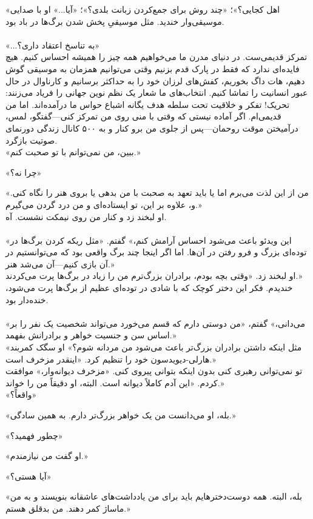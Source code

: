 \noindent
{}

\noindent
{}

\noindent
«اهل کجایی؟»؛ «چند روش برای جمع‌کردن زبانت بلدی؟»؛ «آیا...» او با صدایی موسیقی‌وار خندید. مثل موسیقیِ پخش شدن برگ‌ها در باد بود. \\
 \\
«...به تناسخ اعتقاد داری؟» \\
تمرکز قدیمی‌ست. در دنیای مدرن ما می‌خواهیم همه چیز را همیشه احساس کنیم. هیچ فایده‌ای ندارد که فقط در پارک قدم بزنیم وقتی می‌توانیم همزمان به موسیقی گوش دهیم، هات داگ بخوریم، کفش‌های لرزان خود را به حداکثر برسانیم و کارناوال در حال عبور انسانیت را تماشا کنیم. انتخاب‌های ما شعار یک نظم نوین جهانی را فریاد می‌زنند: تحریک! تفکر و خلاقیت تحت سلطه هدف یگانه اشباع حواس ما درآمده‌اند. اما من قدیمی‌ام. اگر آماده نیستی که وقتی با منی روی من تمرکز کنی—گفتگو، لمس، درآمیختن موقت روحمان—پس از جلوی من برو کنار و به ۵۰۰ کانال زندگی دورنمای صوتیت بازگرد. \\

«ببین، من نمی‌توانم با تو صحبت کنم.»

«چرا نه؟»

«من از این لذت می‌برم اما یا باید تعهد به صحبت با من بدهی یا بروی هنر را نگاه کنی. و، علاوه بر این، تو ایستاده‌ای و من درد گردن می‌گیرم.» \\
او لبخند زد و کنار من روی نیمکت نشست. آه. \\
 \\
«این ویدئو باعث می‌شود احساس آرامش کنم،» گفتم. «مثل ریکه کردن برگ‌ها در توده‌ای بزرگ و فرو رفتن در آن‌ها. اما اگر اینجا چند برگ واقعی بود که می‌توانستیم در آن بازی کنیم—آن می‌شد هنر.» \\
او لبخند زد. «وقتی بچه بودم، برادران بزرگ‌ترم من را زیاد در برگ‌ها پرت می‌کردند.» \\
خندیدم. فکر این دختر کوچک که با شادی در توده‌ای عظیم از برگ‌ها پرت می‌شود، خنده‌دار بود. \\
 \\
«می‌دانی،» گفتم، «من دوستی دارم که قسم می‌خورد می‌تواند شخصیت یک نفر را بر اساس سن و جنسیت خواهر و برادرانش بفهمد.» \\
«مثل اینکه داشتن برادران بزرگ‌تر باعث می‌شود من مردانه شوم؟» او سگک کمربند هارلی-دیویدسون خود را تنظیم کرد. «اینقدر مزخرف است.» \\
تو نمی‌توانی رهبری کنی بدون اینکه بتوانی پیروی کنی. «مزخرف دیوانه‌وار،» موافقت کردم. «این آدم کاملاً دیوانه است. البته، او دقیقاً من را خواند.» \\

«واقعاً؟»

«بله، او می‌دانست من یک خواهر بزرگ‌تر دارم. به همین سادگی.» 

«چطور فهمید؟»

«او گفت من نیازمندم.»

«آیا هستی؟»

«بله، البته. همه دوست‌دخترهایم باید برای من یادداشت‌های عاشقانه بنویسند و به من ماساژ کمر دهند. من بدقلق هستم.»